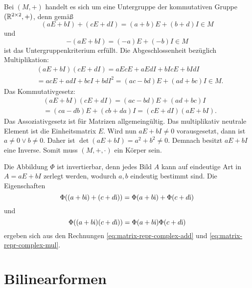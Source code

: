 \begin{Beweis}
Bei $(M,+)$ handelt es sich um eine Untergruppe der
kommutativen Gruppe $(\mathbb R^{2\times 2},+)$, denn gemäß
\begin{equation}\label{eq:matrix-repr-complex-add}
(aE+bI)+(cE+dI) = (a+b)E+(b+d)I \in M
\end{equation}
und
\begin{equation}
-(aE+bI) = (-a)E+(-b)I\in M
\end{equation}
ist das Untergruppenkriterium erfüllt. Die Abgeschlossenheit
bezüglich Multiplikation:
\begin{equation}\label{eq:matrix-repr-complex-mul}
\begin{split}
&(aE+bI)(cE+dI) = aEcE+aEdI+bIcE+bIdI\\
&= acE+adI+bcI+bdI^2
= (ac-bd)E+(ad+bc)I \in M.
\end{split}
\end{equation}
Das Kommutativgesetz:
\begin{equation}
\begin{split}
&(aE+bI)(cE+dI) = (ac-bd)E+(ad+bc)I\\
&= (ca-db)E+(cb+da)I = (cE+dI)(aE+bI).
\end{split}
\end{equation}
Das Assoziativgesetz ist für Matrizen allgemeingültig. Das multiplikativ
neutrale Element ist die Einheitsmatrix $E$. Wird nun $aE+bI\ne 0$
vorausgesetzt, dann ist $a\ne 0\lor b\ne 0$. Daher ist
$\det(aE+bI)=a^2+b^2\ne 0$. Demnach besitzt $aE+bI$ eine Inverse.
Somit muss $(M,+,\cdot)$ ein Körper sein.

Die Abbildung $\Phi$ ist invertierbar, denn jedes Bild $A$ kann
auf eindeutige Art in $A=aE+bI$ zerlegt werden, wodurch $a,b$
eindeutig bestimmt sind. Die Eigenschaften
\begin{equation}
\Phi((a+b\mathrm i)+(c+d\mathrm i)) = \Phi(a+b\mathrm i)+\Phi(c+d\mathrm i)
\end{equation}
und
\begin{equation}
\Phi((a+b\mathrm i)(c+d\mathrm i)) = \Phi(a+b\mathrm i)\Phi(c+d\mathrm i)
\end{equation}
ergeben sich aus den Rechnungen \eqref{eq:matrix-repr-complex-add}
und \eqref{eq:matrix-repr-complex-mul}.\;\qedsymbol
\end{Beweis}

\newpage
\section{Bilinearformen}

